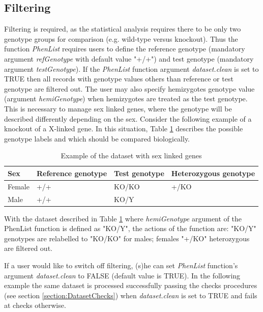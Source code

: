 \documentclass[12pt,a4paper]{article}
\begin{document}
\subsection{Filtering}
\label{section:Filtering}
Filtering is required, as the statistical analysis requires there to be only two genotype groups for comparison (e.g. wild-type versus knockout). Thus the function \textit{PhenList} requires users to define the reference genotype (mandatory argument \textit{refGenotype} with default value "+\slash+") and test genotype (mandatory argument \textit{testGenotype}). 
If the \textit{PhenList} function argument \textit{dataset.clean} is set to TRUE then all records with genotype values others than reference or test genotype are filtered out. 
The user may also specify hemizygotes genotype value (argument \textit{hemiGenotype}) when hemizygotes are treated as the test genotype. 
This is necessary to manage sex linked genes, where the genotype will be described differently depending on the sex. 
Consider the following example of a knockout of a X-linked gene. In this situation, Table \ref{table:03} describes the possible genotype labels and which should be compared biologically.
\begin{table}[!h]
\begin{center}
\begin{tabular}{| l | l | l | l |}
  \hline
Sex&Reference genotype&Test genotype&Heterozygous genotype\\\hline
Female&+\slash +&KO\slash KO&+\slash KO\\
Male&+\slash +&KO\slash Y& \\
\hline  
\end{tabular}
\caption{Example of the dataset with sex linked genes}\label{table:03}
\end{center}
\end{table}

With the dataset described in Table \ref{table:03} where \textit{hemiGenotype} argument of the PhenList function is defined as "KO\slash Y", the actions of the function are:  "KO/Y" genotypes are relabelled to "KO/KO" for males;  females "+\slash KO" heterozygous are filtered out. 

If a user would like to switch off filtering, (s)he can set \textit{PhenList} function's argument \textit{dataset.clean} to FALSE (default value is TRUE). 
In the following example the same dataset is processed successfully passing the checks procedures (see section \ref{section:DatasetChecks}) when \textit{dataset.clean} is set to TRUE and fails at checks otherwise.
\end{document}
